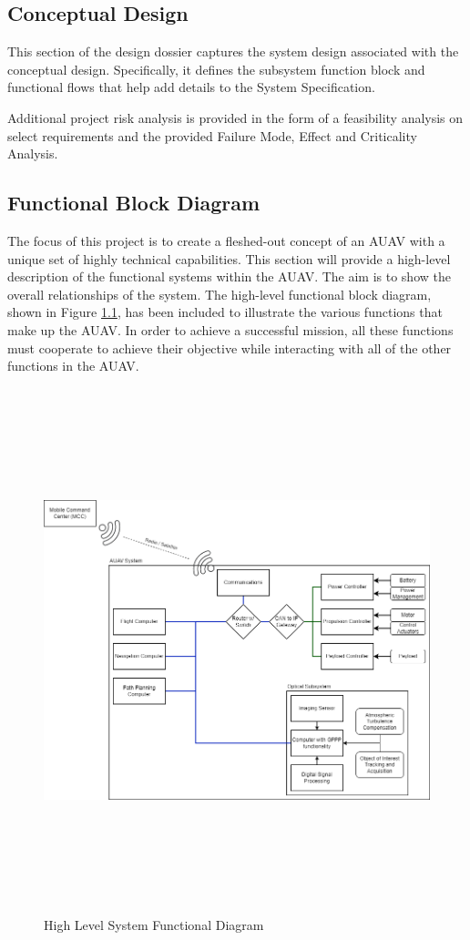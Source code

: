 \begin{fullwidth}
\section{Conceptual Design}
This section of the design dossier captures the system design associated with the conceptual design. Specifically, it defines the subsystem function block and functional flows that help add details to the System Specification.

Additional project risk analysis is provided in the form of a feasibility analysis on select requirements and the provided Failure Mode, Effect and Criticality Analysis.

\subsection{Functional Block Diagram}
    The focus of this project is to create a fleshed-out concept of an AUAV with a unique set of highly technical capabilities. This section will provide a high-level description of the functional systems within the AUAV. The aim is to show the overall relationships of the system. The  high-level functional block diagram, shown in Figure \ref{}, has been included to illustrate the various functions that make up the AUAV. In order to achieve a successful mission, all these functions must cooperate to achieve their objective while interacting with all of the other functions in the AUAV. 

    \begin{figure}
        \centering
        \includegraphics[height=6in]{01 - Design Dossier/images/UAV System Diagram-AUAV System.png}
        \caption{High Level System Functional Diagram}
        \label{fig:high_system_diagram}
    \end{figure}
\end{fullwidth}